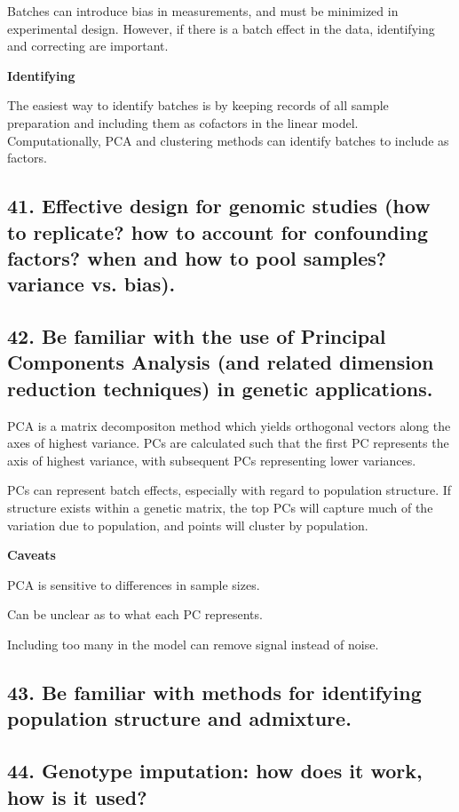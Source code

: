 \documentclass{tufte-handout}
\theoremstyle{noparens}
\begin{document}
Batches can introduce bias in measurements, and must be minimized in experimental design. However, if there is a batch effect in the data, identifying and correcting are important.

\noindent
\textbf{Identifying}

The easiest way to identify batches is by keeping records of all sample preparation and including them as cofactors in the linear model. Computationally, PCA and clustering methods can identify batches to include as factors. 

\newpage
\subsection{41. Effective design for genomic studies (how to replicate? how to account for confounding factors? when and how to pool samples? variance vs. bias).}

\newpage
\subsection{42. Be familiar with the use of Principal Components Analysis (and related dimension reduction techniques) in genetic applications.}

PCA is a matrix decompositon method which yields orthogonal vectors along the axes of highest variance. PCs are calculated such that the first PC represents the axis of highest variance, with subsequent PCs representing lower variances.

PCs can represent batch effects, especially with regard to population structure. If structure exists within a genetic matrix, the top PCs will capture much of the variation due to population, and points will cluster by population. 

\textbf{Caveats}

PCA is sensitive to differences in sample sizes.

Can be unclear as to what each PC represents.

Including too many in the model can remove signal instead of noise.

\newpage
\subsection{43. Be familiar with methods for identifying population structure and admixture.}

\newpage
\subsection{44. Genotype imputation: how does it work, how is it used?}
\end{document}
